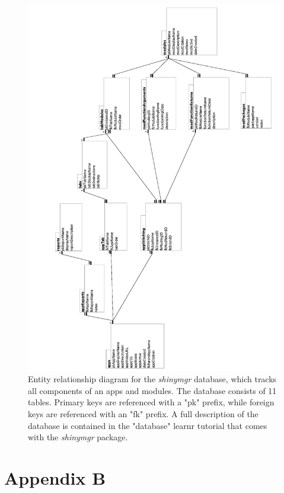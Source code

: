 \begin{figure}[h]
\includegraphics[width=0.85\linewidth]{images/figure8} \caption{Entity relationship diagram for the \textit{shinymgr} database, which tracks all components of an apps and modules.  The database consists of 11 tables. Primary keys are referenced with a "pk" prefix, while foreign keys are referenced with an "fk" prefix. A full description of the database is contained in the "database" learnr tutorial that comes with the \textit{shinymgr} package.}\label{fig:fig8}
\end{figure}

\newpage

\section{Appendix B}\label{appendix-b}

